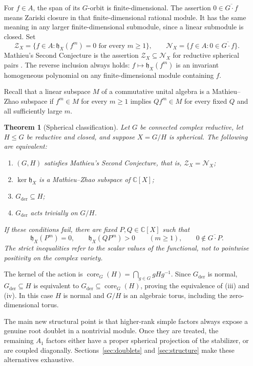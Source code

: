 \documentclass[11pt]{article}
\numberwithin{equation}{section}
\newtheorem{theorem}{Theorem}[section]
\theoremstyle{definition}
\theoremstyle{remark}
\newcommand{\C}{\mathbb C}
\newcommand{\hX}{\mathfrak h_X}
\DeclareMathOperator{\core}{core}
\newcommand{\der}{\mathrm{der}}
\begin{document}
For $f\in A$, the span of its $G$-orbit is finite-dimensional. The assertion $0\in\overline{G\cdot f}$ means Zariski closure in that finite-dimensional rational module. It has the same meaning in any larger finite-dimensional submodule, since a linear submodule is closed. Set
\[
 \mathcal Z_X=\{f\in A:\hX(f^m)=0\text{ for every }m\geq1\},
 \qquad
 \mathcal N_X=\{f\in A:0\in\overline{G\cdot f}\}.
\]
Mathieu's Second Conjecture is the assertion $\mathcal Z_X\subseteq\mathcal N_X$ for reductive spherical pairs \cite[p.~264]{Mathieu}. The reverse inclusion always holds: $f\mapsto\hX(f^m)$ is an invariant homogeneous polynomial on any finite-dimensional module containing $f$.

Recall that a linear subspace $M$ of a commutative unital algebra is a Mathieu--Zhao subspace if $f^m\in M$ for every $m\geq1$ implies $Qf^m\in M$ for every fixed $Q$ and all sufficiently large $m$.

\begin{theorem}[Spherical classification]\label{thm:main}
Let $G$ be connected complex reductive, let $H\leq G$ be reductive and closed, and suppose $X=G/H$ is spherical. The following are equivalent:
\begin{enumerate}[label=\textup{(\roman*)},itemsep=2pt,topsep=4pt]
\item $(G,H)$ satisfies Mathieu's Second Conjecture, that is, $\mathcal Z_X=\mathcal N_X$;
\item $\ker\hX$ is a Mathieu--Zhao subspace of $\C[X]$;
\item $G_{\der}\subseteq H$;
\item $G_{\der}$ acts trivially on $G/H$.
\end{enumerate}
If these conditions fail, there are fixed $P,Q\in\C[X]$ such that
\begin{equation}\label{eq:negative}
 \hX(P^m)=0,\qquad \hX(QP^m)>0\qquad(m\geq1),
 \qquad 0\notin\overline{G\cdot P}.
\end{equation}
The strict inequalities refer to the scalar values of the functional, not to pointwise positivity on the complex variety.
\end{theorem}

The kernel of the action is $\core_G(H)=\bigcap_{g\in G}gHg^{-1}$. Since $G_{\der}$ is normal, $G_{\der}\subseteq H$ is equivalent to $G_{\der}\subseteq\core_G(H)$, proving the equivalence of (iii) and (iv). In this case $H$ is normal and $G/H$ is an algebraic torus, including the zero-dimensional torus.

The main new structural point is that higher-rank simple factors always expose a genuine root doublet in a nontrivial module. Once they are treated, the remaining $A_1$ factors either have a proper spherical projection of the stabilizer, or are coupled diagonally. Sections~\ref{sec:doublets} and \ref{sec:structure} make these alternatives exhaustive.
\end{document}
